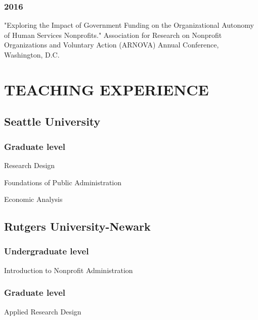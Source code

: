 \documentclass[letterpaper]{article}
\renewenvironment{itemize}{
  \begin{list}{}{
    \setlength{\leftmargin}{1.5em}
  }
}{
  \end{list}
}
\begin{document}
\subsubsection*{2016}
\begin{itemize}

\item "Exploring the Impact of Government Funding on the Organizational Autonomy of Human Services Nonprofits." Association for Research on Nonprofit Organizations and Voluntary Action (ARNOVA) Annual Conference, Washington, D.C.

\end{itemize}

\bigskip

\section*{TEACHING EXPERIENCE}
\subsection*{Seattle University}
\subsubsection*{Graduate level}
\begin{itemize}
	\item Research Design
	\item Foundations of Public Administration
	\item Economic Analysis
\end{itemize}

\subsection*{Rutgers University-Newark}
\subsubsection*{Undergraduate level}
\begin{itemize}	
\item Introduction to Nonprofit Administration
\end{itemize}

\subsubsection*{Graduate level}
\begin{itemize}	
\item Applied Research Design
\end{itemize}
\end{document}
